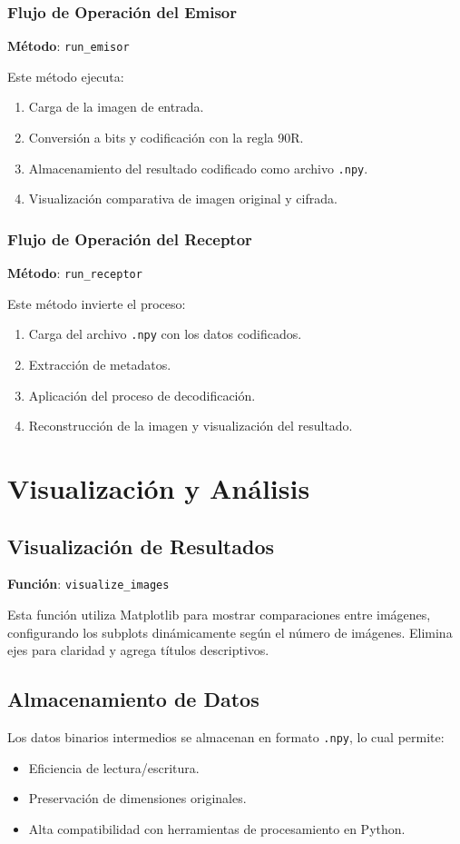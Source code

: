 \subsubsection{Flujo de Operaci\'on del Emisor}
\textbf{M\'etodo}: \texttt{run\_emisor}

Este m\'etodo ejecuta:
\begin{enumerate}
\item Carga de la imagen de entrada.
\item Conversi\'on a bits y codificaci\'on con la regla 90R.
\item Almacenamiento del resultado codificado como archivo \texttt{.npy}.
\item Visualizaci\'on comparativa de imagen original y cifrada.
\end{enumerate}

\subsubsection{Flujo de Operaci\'on del Receptor}
\textbf{M\'etodo}: \texttt{run\_receptor}

Este m\'etodo invierte el proceso:
\begin{enumerate}
\item Carga del archivo \texttt{.npy} con los datos codificados.
\item Extracci\'on de metadatos.
\item Aplicaci\'on del proceso de decodificaci\'on.
\item Reconstrucci\'on de la imagen y visualizaci\'on del resultado.
\end{enumerate}

\section{Visualizaci\'on y An\'alisis}
\subsection{Visualizaci\'on de Resultados}
\textbf{Funci\'on}: \texttt{visualize\_images}

Esta funci\'on utiliza Matplotlib para mostrar comparaciones entre im\'agenes, configurando los subplots din\'amicamente seg\'un el n\'umero de im\'agenes. Elimina ejes para claridad y agrega t\'itulos descriptivos.

\subsection{Almacenamiento de Datos}
Los datos binarios intermedios se almacenan en formato \texttt{.npy}, lo cual permite:
\begin{itemize}
\item Eficiencia de lectura/escritura.
\item Preservaci\'on de dimensiones originales.
\item Alta compatibilidad con herramientas de procesamiento en Python.
\end{itemize}

